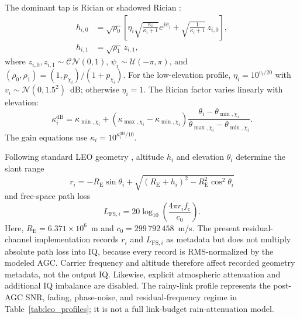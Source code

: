 \documentclass[journal]{IEEEtran}
\begin{document}
The dominant tap is Rician or shadowed Rician \cite{abdi2003lms}:
\begin{align}
h_{i,0}&=\sqrt{\rho_0}\left[
\eta_i\sqrt{\frac{\kappa_i}{\kappa_i+1}}e^{j\psi_i}
{}+\sqrt{\frac{1}{\kappa_i+1}}\,z_{i,0}\right],\\
h_{i,1}&=\sqrt{\rho_1}\,z_{i,1},
\end{align}
where \(z_{i,0},z_{i,1}\sim\mathcal{CN}(0,1)\),
\(\psi_i\sim\mathcal{U}(-\pi,\pi)\), and
\((\rho_0,\rho_1)=(1,p_{\chi_i})/(1+p_{\chi_i})\).
For the low-elevation profile,
\(\eta_i=10^{v_i/20}\) with
\(v_i\sim\mathcal{N}(0,1.5^2)\)~dB; otherwise \(\eta_i=1\).
The Rician factor varies linearly with elevation:
\begin{equation}
\kappa_i^{\mathrm{dB}}=\kappa_{\min,\chi_i}+
(\kappa_{\max,\chi_i}-\kappa_{\min,\chi_i})
\frac{\theta_i-\theta_{\min,\chi_i}}
{\theta_{\max,\chi_i}-\theta_{\min,\chi_i}}.
\end{equation}
The gain equations use \(\kappa_i=10^{\kappa_i^{\mathrm{dB}}/10}\).

Following standard LEO geometry \cite{3gpp38811}, altitude \(h_i\) and elevation \(\theta_i\) determine the slant range
\begin{equation}
r_i=-R_{\mathrm{E}}\sin\theta_i+
\sqrt{(R_{\mathrm{E}}+h_i)^2-
R_{\mathrm{E}}^2\cos^2\theta_i}
\end{equation}
and free-space path loss
\begin{equation}
L_{\mathrm{FS},i}=20\log_{10}
\left(\frac{4\pi r_i f_{\mathrm{c}}}{c_0}\right).
\end{equation}
Here, \(R_{\mathrm{E}}=6.371\times10^6\)~m and
\(c_0=299\,792\,458\)~m/s.
The present residual-channel implementation records \(r_i\) and \(L_{\mathrm{FS},i}\) as metadata but does not multiply absolute path loss into IQ, because every record is RMS-normalized by the modeled AGC. Carrier frequency and altitude therefore affect recorded geometry metadata, not the output IQ. Likewise, explicit atmospheric attenuation and additional IQ imbalance are disabled. The rainy-link profile represents the post-AGC SNR, fading, phase-noise, and residual-frequency regime in Table~\ref{tab:leo_profiles}; it is not a full link-budget rain-attenuation model.
\end{document}
